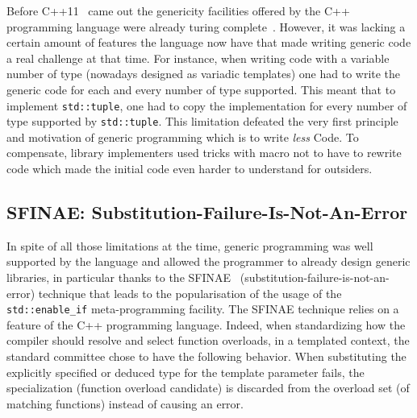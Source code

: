 Before C++11~\parencite{iso.2011.cpp} came out the genericity facilities offered by the C++ programming language were
already turing complete~\parencite{veldhuizen.2003.c++templates}. However, it was lacking a certain amount of features
the language now have that made writing generic code a real challenge at that time. For instance, when writing code with
a variable number of type (nowadays designed as variadic templates) one had to write the generic code for each and every
number of type supported. This meant that to implement \texttt{std::tuple}, one had to copy the implementation for every
number of type supported by \texttt{std::tuple}. This limitation defeated the very first principle and motivation of
generic programming which is to write \emph{less} Code. To compensate, library implementers used tricks with macro not
to have to rewrite code which made the initial code even harder to understand for outsiders.

\subsection{SFINAE: Substitution-Failure-Is-Not-An-Error}
\label{genericity.language.precpp11.sebsec.sfinae}

In spite of all those limitations at the time, generic programming was well supported by the language and allowed the
programmer to already design generic libraries, in particular thanks to the SFINAE~\parencite{vandevoorde.2002.c++}
(substitution-failure-is-not-an-error) technique that leads to the popularisation of the usage of the
\texttt{std::enable\_if} meta-programming facility. The SFINAE technique relies on a feature of the C++ programming
language. Indeed, when standardizing how the compiler should resolve and select function overloads, in a templated
context, the standard committee chose to have the following behavior. When substituting the explicitly specified or
deduced type for the template parameter fails, the specialization (function overload candidate) is discarded from the
overload set (of matching functions) instead of causing an error.

